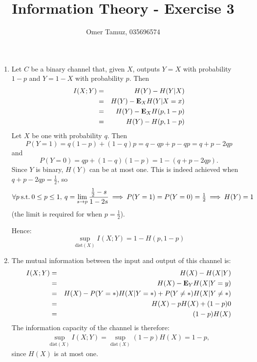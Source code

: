 \documentclass[11pt]{article} \usepackage{amssymb}
\newcommand{\E}{{\bf E}} \newcommand{\Cov}{{\bf Cov}}
\newcommand{\half}{{\textstyle \frac12}}
\begin{document}
\title{Information Theory - Exercise 3}

 \author{Omer Tamuz, 035696574}
\maketitle


\begin{enumerate}
\item
Let $C$ be a binary channel that, given $X$, outputs $Y=X$ with
probability $1-p$ and $Y=1-X$ with probability $p$. Then 
\begin{eqnarray*}
  I(X;Y)&=&H(Y)-H(Y|X)
     \\ &=&H(Y) - \E_XH(Y|X=x) 
     \\ &=&H(Y)-\E_XH(p,1-p)
     \\ &=&H(Y)-H(p,1-p)
\end{eqnarray*}
Let $X$ be one with probability $q$. Then 
\begin{equation*}
P(Y=1)=q(1-p)+(1-q)p=q-qp+p-qp=q+p-2qp  
\end{equation*}
 and
 \begin{equation*}
 P(Y=0)=qp+(1-q)(1-p)=1-(q+p-2qp).
 \end{equation*}
Since $Y$ is binary, $H(Y)$ can be at most one. This is indeed achieved when 
$q+p-2qp=\half$, so
\begin{equation*}
\forall p \: \mbox{s.t.}\: 0\leq p \leq 1, \: q= \lim_{s\to p}{\half-s\over 1-2s}  \:\Longrightarrow\: P(Y=1)=P(Y=0)=\half \:\Longrightarrow\: H(Y)=1
\end{equation*}
(the limit is required for when $p=\half$). 

Hence:
\begin{equation*}
  \sup_{\mbox{dist}(X)}I(X;Y)=1-H(p,1-p)
\end{equation*}
\item
The mutual information between the input and output of this channel is:
\begin{eqnarray*}
  I(X;Y)&=&H(X)-H(X|Y)
   \\   &=&H(X)-\E_YH(X|Y=y)
   \\   &=&H(X)-P(Y=*)H(X|Y=*)+P(Y\not=*)H(X|Y\not=*)
   \\   &=&H(X)-pH(X)+(1-p)0
   \\   &=&(1-p)H(X)
\end{eqnarray*}
The information capacity of the channel is therefore:
\begin{eqnarray*}
  \sup_{\mbox{dist}(X)}I(X;Y)=\sup_{\mbox{dist}(X)}(1-p)H(X)=1-p,
\end{eqnarray*}
since $H(X)$ is at most one.


\end{enumerate}
\end{document}
